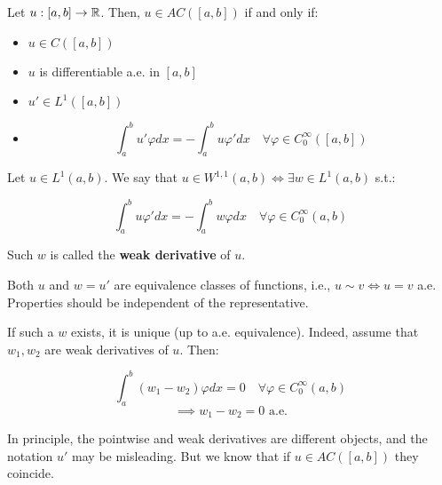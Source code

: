 \begin{fproposition}
    Let $u: [a, b] \to \mathbb{R}$. Then, $u \in AC([a, b])$ if and only if:
    \vspace{1em}
    \begin{itemize}
        \item $u \in C([a, b])$
        \vspace{1em}
        \item $u$ is differentiable a.e. in $[a, b]$
        \vspace{1em}
        \item $u' \in L^1([a, b])$
        \vspace{1em}
        \item $$\int_a^b u' \varphi dx = - \int_a^b u \varphi' dx \quad \forall \varphi \in C_0^{\infty}([a, b])$$
    \end{itemize}
\end{fproposition}

\vspace{1em}

\begin{fdefinition}
    Let $u \in L^1(a, b)$. We say that $u \in W^{1,1}(a, b) \iff \exists w \in L^1(a, b)$ s.t.:

    $$\int_a^b u \varphi' dx = - \int_a^b w \varphi dx \quad \forall \varphi \in C_0^{\infty}(a, b)$$

    Such $w$ is called the \textbf{weak derivative} of $u$.
\end{fdefinition}

\begin{fremark}
    Both $u$ and $w = u'$ are equivalence classes of functions, i.e., $u \sim v \iff u = v$ a.e.
Properties should be independent of the representative.
\end{fremark}

\begin{fremark}
    If such a $w$ exists, it is unique (up to a.e. equivalence). Indeed, 
    assume that $w_1, w_2$ are weak derivatives of $u$. Then:
    
    $$\int_a^b (w_1 - w_2) \varphi dx = 0 \quad \forall \varphi \in C_0^{\infty}(a, b)$$
    $$\implies w_1 - w_2 = 0 \text{ a.e.}$$
\end{fremark}

\begin{fremark}
    In principle, the pointwise and weak derivatives are different objects,
    and the notation $u'$ may be misleading. But we know that if $u \in AC([a, b])$
    they coincide.    
\end{fremark}

